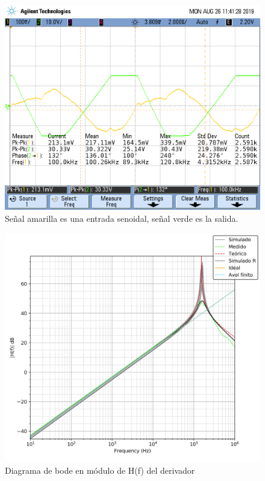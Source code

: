 \begin{figure}[H]
	\centering
	\includegraphics[scale=0.4]{Derivador/Mediciones/Osciloscopio/Justificacion/scope_4.png}
	\caption{Se\~nal amarilla es una entrada senoidal, se\~nal verde es la salida.}
	\label{fig:justificacion_derivador}
\end{figure}

\begin{figure}[H]
	\centering
	\includegraphics[scale=0.6]{Recursos/Derivador/bode_modulo.png}
	\caption{Diagrama de bode en m\'odulo de H(f) del derivador}
	\label{fig:derivador_bode_modulo}
\end{figure}


